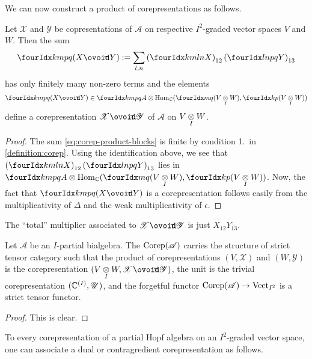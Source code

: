 We can now construct a product of corepresentations as follows.
\begin{Lem} Let $\mathscr{X}$ and $\mathscr{Y}$ be copresentations of
  $\mathscr{A}$ on respective $I^{2}$-graded vector spaces $V$ and
  $W$. Then the sum
  \begin{align} \label{eq:corep-product-blocks}
     \Gr{(X\Circt Y)}{k}{p}{m}{q} := \sum_{l,n}
    \left(\Gr{X}{k}{l}{m}{n}\right)_{12}\left(\Gr{Y}{l}{p}{n}{q}\right)_{13}
  \end{align}
  has only finitely many non-zero terms and the elements
 \[\Gr{(X\Circt
    Y)}{k}{p}{m}{q}\in \Gr{A}{k}{p}{m}{q} \otimes
  \Hom_\C(\Gru{(V\itimes W)}{m}{q},\Gru{(V\itimes W)}{k}{p})
\]
define a corepresentation $\mathscr{X} \Circt \mathscr{Y}$ of
$\mathscr{A}$ on $V\underset{I}{\otimes} W$. 
\end{Lem} 
\begin{proof}
  The sum \eqref{eq:corep-product-blocks} is finite by condition 1.\
  in \ref{definition:corep}. Using the identification above, we see that
 $
  \left(\Gr{X}{k}{l}{m}{n}\right)_{12}\left(\Gr{Y}{l}{p}{n}{q}\right)_{13}
  $ lies in $ \Gr{A}{k}{p}{m}{q} \otimes \Hom_\C(\Gru{(V\itimes
    W)}{m}{q},\Gru{(V\itimes W)}{k}{p})$. Now,   the fact that $\Gr{(X\Circt
    Y)}{k}{p}{m}{q}$ is a corepresentation follows easily
  from the multiplicativity of $\Delta$ and the weak multiplicativity
  of $\epsilon$.
\end{proof}
\begin{Rem}
  The ``total'' multiplier associated to $\mathscr{X}\Circt
  \mathscr{Y}$   is  just $X_{12}Y_{13}$.
\end{Rem}

\begin{Prop} \label{prop:corep-monoidal} Let $\mathscr{A}$ be an
  $I$-partial bialgebra. The $\mathrm{Corep}(\mathscr{A})$ carries the
  structure of strict tensor category such that the product of
  corepresentations $(V,\mathscr{X})$ and $(W,\mathscr{Y})$ is the
  corepresentation $(V\itimes W,\mathscr{X}\Circt \mathscr{Y})$,  the
  unit is the trivial corepresentation $(\mathbb{C}^{(I)},\mathscr{U})$, and the forgetful functor
  $\mathrm{Corep}(\mathscr{A}) \to \mathrm{Vect}_{I^{2}}$ is a strict tensor functor.
\end{Prop}
\begin{proof}
This is clear.
\end{proof}

To every corepresentation of a partial Hopf algebra on an
$I^{2}$-graded vector space, one can associate a dual or
contragredient corepresentation as follows.


